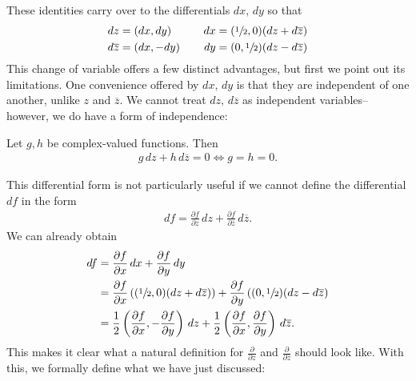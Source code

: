 \documentclass{memoir}
\begin{document}
These identities carry over to the differentials \(dx, \,d y\) so that
\begin{align*}
	dz &= (dx,dy) & \quad dx &= (\sfrac{1}{2},0)(dz + d\overline{z}) \\
	d \overline{z} &= (dx,-dy) &\quad \,d y &= (0,\sfrac{1}{2})(dz - d \overline{z})
\end{align*}
This change of variable offers a few distinct advantages, but first we point out its limitations. One convenience offered by \(dx,\,d y\) is that they are independent of one another, unlike \(z\) and \(\overline{z}\). We cannot treat \(dz,\,d \overline{z}\) as independent variables-- however, we do have a form of independence:
\begin{prop}
	Let \(g,h\) be complex-valued functions. Then
	\begin{align*}
		g \,d z + h \,d \overline{z} = 0 \iff g= h = 0.
	\end{align*}
\end{prop}

This differential form is not particularly useful if we cannot define the differential \(df\) in the form
\begin{align*}
	df = \frac{\partial f}{\partial z} \,d z + \frac{\partial f}{\partial \overline{z}} \,d \overline{z}.
\end{align*}
We can already obtain
\begin{align*}
	df &= \frac{\partial f}{\partial x} \,d x + \frac{\partial f}{\partial y} \,d y\\
	   &= \frac{\partial f}{\partial x} \left( (\sfrac{1}{2},0)(dz + d \overline{z} ) \right) + \frac{\partial f}{\partial y} \left( (0,\sfrac{1}{2})(dz - d \overline{z} \right) \\
	   &= \frac{1}{2}\left( \frac{\partial f}{\partial x} , - \frac{\partial f}{\partial y}  \right) \,d z + \frac{1}{2} \left( \frac{\partial f}{\partial x} , \frac{\partial f}{\partial y}  \right) \,d \overline{z}.
\end{align*}
This makes it clear what a natural definition for \(\frac{\partial }{\partial z} \) and \(\frac{\partial }{\partial \overline{z}} \) should look like. With this, we formally define what we have just discussed:
\end{document}
